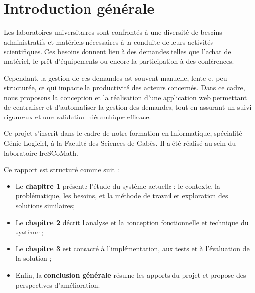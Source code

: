 \chapter*{ Introduction générale}

Les laboratoires universitaires sont confrontés à une diversité de besoins administratifs et matériels nécessaires à la conduite de leurs activités scientifiques. Ces besoins donnent lieu à des demandes telles que l’achat de matériel, le prêt d’équipements ou encore la participation à des conférences.

Cependant, la gestion de ces demandes est souvent manuelle, lente et peu structurée, ce qui impacte la productivité des acteurs concernés. Dans ce cadre, nous proposons la conception et la réalisation d’une application web permettant de centraliser et d’automatiser la gestion des demandes, tout en assurant un suivi rigoureux et une validation hiérarchique efficace.

Ce projet s’inscrit dans le cadre de notre formation en Informatique, spécialité Génie Logiciel, à la Faculté des Sciences de Gabès. Il a été réalisé au sein du laboratoire IreSCoMath.

Ce rapport est structuré comme suit :

\begin{itemize}
  \item Le \textbf{chapitre 1} présente l’étude du système actuelle : le contexte, la problématique, les besoins, et la méthode de travail et exploration des  solutions similaires;
  \item Le \textbf{chapitre 2} décrit l’analyse et la conception fonctionnelle et technique du système ;
  \item Le \textbf{chapitre 3} est consacré à l’implémentation, aux tests et à l’évaluation de la solution ;
  \item Enfin, la \textbf{conclusion générale} résume les apports du projet et propose des perspectives d’amélioration.
\end{itemize}
